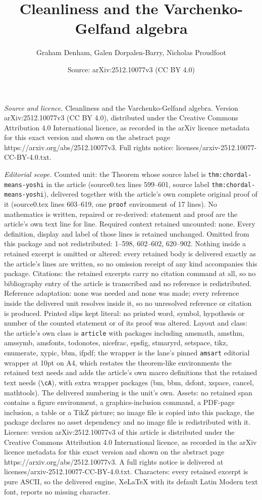 \documentclass[10pt,a4paper]{amsart}
\title[Cleanliness and the Varchenko-Gelfand algebra]{Cleanliness and the Varchenko-Gelfand algebra}
\author{Graham Denham, Galen Dorpalen-Barry, Nicholas Proudfoot}
\date{Source: arXiv:2512.10077v3 (CC BY 4.0)}
\begin{document}
\maketitle

\noindent\emph{Source and licence.} Cleanliness and the Varchenko-Gelfand algebra. Version arXiv:2512.10077v3 (CC BY 4.0), distributed under the Creative Commons Attribution 4.0 International licence, as recorded in the arXiv licence metadata for this exact version and shown on the abstract page https://arxiv.org/abs/2512.10077v3. Full rights notice: licenses/arxiv-2512.10077-CC-BY-4.0.txt.\par\smallskip

\noindent\textit{Editorial scope.} Counted unit: the Theorem whose source label is \texttt{thm:chordal-means-yoshi} in the article (source0.tex lines 599--601, source label \texttt{thm:chordal-means-yoshi}), delivered together with the article's own complete original proof of it (source0.tex lines 603--619, one \texttt{proof} environment of 17 lines). No mathematics is written, repaired or re-derived: statement and proof are the article's own text line for line. Required context retained uncounted: none. Every definition, display and label of those lines is retained unchanged. Omitted from this package and not redistributed: 1--598, 602--602, 620--902. Nothing inside a retained excerpt is omitted or altered: every retained body is delivered exactly as the article's lines are written, so no omission receipt of any kind accompanies this package. Citations: the retained excerpts carry no citation command at all, so no bibliography entry of the article is transcribed and no reference is redistributed. Reference adaptation: none was needed and none was made; every reference inside the delivered unit resolves inside it, so no unresolved reference or citation is produced. Printed slips kept literal: no printed word, symbol, hypothesis or number of the counted statement or of its proof was altered. Layout and class: the article's own class is \texttt{article} with packages including amsmath, amsthm, amssymb, amsfonts, todonotes, nicefrac, epsfig, stmaryrd, setspace, tikz, enumerate, xypic, bbm, ifpdf; the wrapper is the lane's pinned \texttt{amsart} editorial wrapper at 10pt on A4, which restates the theorem-like environments the retained text needs and adds the article's own macro definitions that the retained text needs (\texttt{\textbackslash cA}), with extra wrapper packages (bm, bbm, dsfont, xspace, cancel, mathtools). The delivered numbering is the unit's own. Assets: no retained span contains a figure environment, a graphics-inclusion command, a PDF-page inclusion, a table or a TikZ picture; no image file is copied into this package, the package declares no asset dependency and no image file is redistributed with it. Licence: version arXiv:2512.10077v3 of this article is distributed under the Creative Commons Attribution 4.0 International licence, as recorded in the arXiv licence metadata for this exact version and shown on the abstract page https://arxiv.org/abs/2512.10077v3. A full rights notice is delivered at licenses/arxiv-2512.10077-CC-BY-4.0.txt. Characters: every retained excerpt is pure ASCII, so the delivered engine, XeLaTeX with its default Latin Modern text font, reports no missing character.
\end{document}
